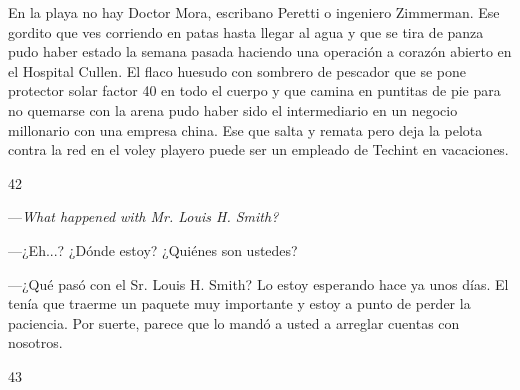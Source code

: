 \documentclass[12pt,twoside,openright,a5paper]{book}
\begin{document}
\nopagebreak

\vspace{0.5cm}

\nopagebreak

En la playa no hay Doctor Mora, escribano Peretti
o ingeniero Zimmerman. Ese gordito que ves corriendo en patas hasta llegar
al agua y que se tira de panza pudo haber estado la semana pasada haciendo una
operación a corazón abierto en el Hospital Cullen.
El flaco huesudo con sombrero de pescador que se pone protector solar factor
40 en todo el cuerpo y que camina en puntitas de pie para no quemarse 
con la arena pudo haber sido
el intermediario en un negocio millonario con una empresa china. Ese que
salta y remata pero deja la pelota contra la red en el voley playero puede
ser un empleado de Techint en vacaciones.

\vspace{0.5cm}

\hrulefill \hspace{0.1cm}\decofourleft\hspace{0.2cm} 42 \hspace{0.2cm}\decofourright \hspace{0.1cm}\hrulefill

\nopagebreak

\vspace{0.5cm}

\nopagebreak

---\emph{What happened with Mr. Louis H. Smith?}

---¿Eh...? ¿Dónde estoy? ¿Quiénes son ustedes?

---¿Qué pasó con el Sr. Louis H. Smith? Lo estoy esperando hace ya
unos días. El tenía que traerme un paquete muy importante y estoy a
punto de perder la paciencia. Por suerte, parece que lo mandó a usted a arreglar
cuentas con nosotros.

\vspace{0.5cm}

\hrulefill \hspace{0.1cm}\decofourleft\hspace{0.2cm} 43 \hspace{0.2cm}\decofourright \hspace{0.1cm}\hrulefill

\nopagebreak

\vspace{0.5cm}

\nopagebreak
\end{document}
